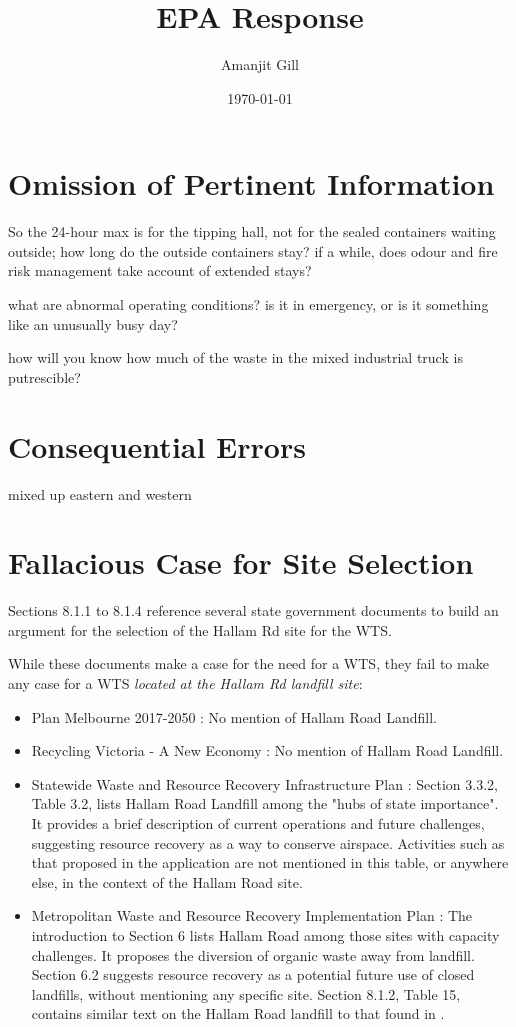 \documentclass{article}
\title{EPA Response}
\author{\large Amanjit Gill}
\date{\small \today}
\begin{document}
\maketitle

\section{Omission of Pertinent Information}

So the 24-hour max is for the tipping hall, not for the sealed containers waiting outside; how long do the outside containers stay? if a while, does odour and fire risk management take account of extended stays?

what are abnormal operating conditions? is it in emergency, or is it something like an unusually busy day?

how will you know how much of the waste in the mixed industrial truck is putrescible?

\section{Consequential Errors}

mixed up eastern and western

\section{Fallacious Case for Site Selection}

Sections 8.1.1 to 8.1.4 reference several state government documents to build an argument for the selection of the Hallam Rd site for the WTS.

While these documents make a case for the need for a WTS, they fail to make any case for a WTS \textit{located at the Hallam Rd landfill site}:

\begin{itemize}
  \item Plan Melbourne 2017-2050 \cite{planmelb}: No mention of Hallam Road Landfill.
  \item Recycling Victoria - A New Economy \cite{recyclingvic}: No mention of Hallam Road Landfill.
  \item Statewide Waste and Resource Recovery Infrastructure Plan \cite{swrrip}: Section 3.3.2, Table 3.2, lists Hallam Road Landfill among the "hubs of state importance". It provides a brief description of current operations and future challenges, suggesting resource recovery as a way to conserve airspace. Activities such as that proposed in the application are not mentioned in this table, or anywhere else, in the context of the Hallam Road site.
  \item Metropolitan Waste and Resource Recovery Implementation Plan \cite{mwrrip}: The introduction to Section 6 lists Hallam Road among those sites with capacity challenges. It proposes the diversion of organic waste away from landfill. Section 6.2 suggests resource recovery as a potential future use of closed landfills, without mentioning any specific site. Section 8.1.2, Table 15, contains similar text on the Hallam Road landfill to that found in \cite{swrrip}.
\end{itemize}
\end{document}
